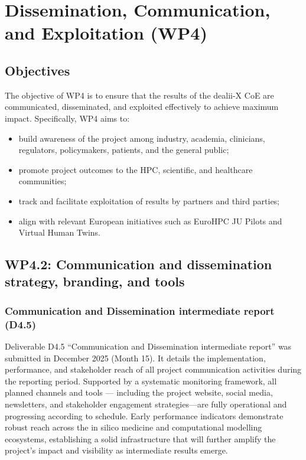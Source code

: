 \documentclass[a4paper,12pt, numbers]{article}
\begin{document}
\newpage

\section{{Dissemination, Communication, and Exploitation (WP4)}}
\label{sec:wp4_communication}

\subsection{Objectives}

The objective of WP4 is to ensure that the results of the dealii-X CoE are communicated, disseminated, and exploited effectively to achieve maximum impact. Specifically, WP4 aims to:
\begin{itemize}[left=1em, itemsep=0pt, topsep=0pt] 
\item build awareness of the project among industry, academia, clinicians, regulators, policymakers, patients, and the general public;
\item promote project outcomes to the HPC, scientific, and healthcare communities;
\item track and facilitate exploitation of results by partners and third parties;
\item align with relevant European initiatives such as EuroHPC JU Pilots and Virtual Human Twins.
\end{itemize}

\subsection{WP4.2: Communication and dissemination strategy, branding, and tools}


\subsubsection*{Communication and Dissemination intermediate report (D4.5)}

Deliverable D4.5 ``Communication and Dissemination intermediate report'' was submitted in December 2025 (Month 15). It details the implementation, performance, and stakeholder reach of all project communication activities during the reporting period. Supported by a systematic monitoring framework, all planned channels and tools --- including the project website, social media, newsletters, and stakeholder engagement strategies—are fully operational and progressing according to schedule. Early performance indicators demonstrate robust reach across the in silico medicine and computational modelling ecosystems, establishing a solid infrastructure that will further amplify the project's impact and visibility as intermediate results emerge.
\end{document}
